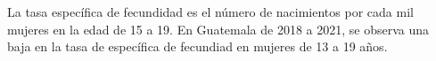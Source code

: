 La tasa específica de fecundidad es el número de nacimientos por cada mil mujeres en la edad de 15 a 19. En Guatemala de 2018 a 2021, se observa una baja en la tasa de específica de fecundiad en mujeres de 13 a 19 años.